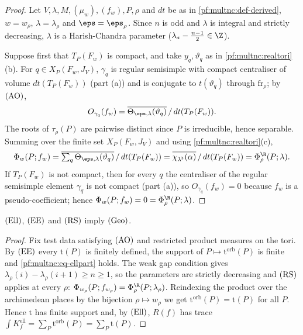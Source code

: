 \begin{proof}
Let $V,\lambda,M,(\mu_w),(f_w),P,\rho$ and $dt$ be as in \cref{pf:multnc:def-derived}, $w=w_\rho$, $\lambda=\lambda_\rho$
and $\eps=\eps_\rho$. Since $n$ is odd and $\lambda$ is integral and strictly decreasing, $\lambda$ is a Harish-Chandra
parameter ($\lambda_a-\frac{n-1}2\in\Z$).

Suppose first that $T_P(F_w)$ is compact, and take $y_q,\vartheta_q$ as in \cref{pf:multnc:realtori}(b). For
$q\in X_P(F_w,J_V)$, $\gamma_q$ is regular semisimple with compact centraliser of volume $dt(T_P(F_w))$ (part (a)) and is
conjugate to $t(\vartheta_q)$ through $\mathrm{fr}_\rho$; by $\textup{(AO)}$,
\[
O_{\gamma_q}(f_w)=\overline{\Theta_{\eps,\lambda}(\vartheta_q)}\,/\,dt(T_P(F_w)).
\]
The roots of $\tau_\rho(P)$ are pairwise distinct since $P$ is irreducible, hence separable. Summing over the finite set
$X_P(F_w,J_V)$ and using \cref{pf:multnc:realtori}(c),
\[
\multncPhi_w(P;f_w)=\overline{\textstyle\sum_q\Theta_{\eps,\lambda}(\vartheta_q)}\,/\,dt(T_P(F_w))
=\overline{\chi_{\lambda^\flat}(\alpha)}\,/\,dt(T_P(F_w))=\multncPhi^{\R}_\rho(P;\lambda).
\]
If $T_P(F_w)$ is not compact, then for every $q$ the centraliser of the regular semisimple element $\gamma_q$ is not
compact (part (a)), so $O_{\gamma_q}(f_w)=0$ because $f_w$ is a pseudo-coefficient; hence
$\multncPhi_w(P;f_w)=0=\multncPhi^{\R}_\rho(P;\lambda)$.
\end{proof}

\begin{proposition}\label{pf:multnc:geomexp}
$\textup{(Ell)}$, $\textup{(EE)}$ and $\textup{(RS)}$ imply $\textup{(Geo)}$.
\end{proposition}

\begin{proof}
Fix test data satisfying $\textup{(AO)}$ and restricted product measures on the tori. By $\textup{(EE)}$ every
$\mathrm{t}(P)$ is finitely defined, the support of $P\mapsto\mathrm{t}^{\mathrm{orb}}(P)$ is finite and
\eqref{pf:multnc:eq-ellpart} holds. The weak gap condition gives $\lambda_\rho(i)-\lambda_\rho(i+1)\ge n\ge1$, so the
parameters are strictly decreasing and $\textup{(RS)}$ applies at every $\rho$:
$\multncPhi_{w_\rho}(P;f_{w_\rho})=\multncPhi^\R_\rho(P;\lambda_\rho)$. Reindexing the product over the archimedean places by
the bijection $\rho\mapsto w_\rho$ we get $\mathrm{t}^{\mathrm{orb}}(P)=\mathrm{t}(P)$ for all $P$. Hence $\mathrm{t}$ has
finite support and, by $\textup{(Ell)}$, $R(f)$ has trace $\int K^{\mathrm{ell}}_f=\sum_P\mathrm{t}^{\mathrm{orb}}(P)
=\sum_P\mathrm{t}(P)$.
\end{proof}

